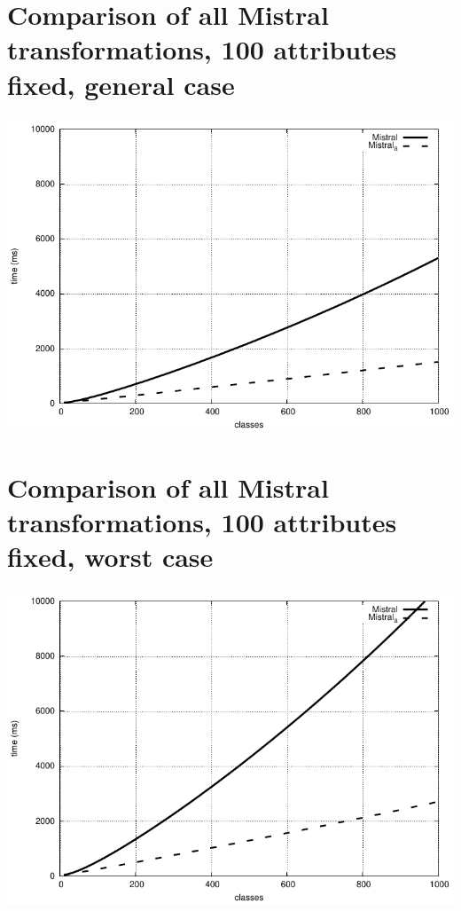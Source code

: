 \documentclass[a4paper,final]{article}
\begin{document}
\section*{Comparison of all Mistral transformations, 100 attributes fixed, general case}
\includegraphics[width=\textwidth]{mistral_compared_general_100attributes}

\section*{Comparison of all Mistral transformations, 100 attributes fixed, worst case}
\includegraphics[width=\textwidth]{mistral_compared_worst_100attributes}
\end{document}
